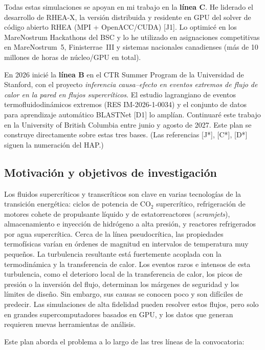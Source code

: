 \documentclass[11pt]{article}
\begin{document}
Todas estas simulaciones se apoyan en mi trabajo en la \textbf{línea C}. He liderado el
desarrollo de RHEA-X, la versión distribuida y residente en GPU del solver de código
abierto RHEA (MPI + OpenACC/CUDA) [J1]. Lo optimicé en los MareNostrum Hackathons del BSC
y lo he utilizado en asignaciones competitivas en MareNostrum~5, Finisterrae~III y
sistemas nacionales canadienses (más de 10 millones de horas de núcleo/GPU en total).

En 2026 inicié la \textbf{línea B} en el CTR Summer Program de la Universidad de Stanford,
con el proyecto \emph{inferencia causa--efecto en eventos extremos de flujo de calor en la
pared en flujos supercríticos}. El estudio lagrangiano de eventos termofluidodinámicos
extremos (RES IM-2026-1-0034) y el conjunto de datos para aprendizaje automático BLASTNet
[D1] lo amplían. Continuaré este trabajo en la University of British Columbia entre junio y
agosto de 2027. Este plan se construye directamente sobre estas tres bases. (Las
referencias [J*], [C*], [D*] siguen la numeración del HAP.)

\subsection{Motivación y objetivos de investigación}
Los fluidos supercríticos y transcríticos son clave en varias tecnologías de la transición
energética: ciclos de potencia de CO$_2$ supercrítico, refrigeración de motores cohete de
propulsante líquido y de estatorreactores (\emph{scramjets}), almacenamiento e inyección de
hidrógeno a alta presión, y reactores refrigerados por agua supercrítica. Cerca de la línea
pseudocrítica, las propiedades termofísicas varían en órdenes de magnitud en intervalos de
temperatura muy pequeños. La turbulencia resultante está fuertemente acoplada con la
termodinámica y la transferencia de calor. Los eventos raros e intensos de esta turbulencia,
como el deterioro local de la transferencia de calor, los picos de presión o la inversión del
flujo, determinan los márgenes de seguridad y los límites de diseño. Sin embargo, sus causas
se conocen poco y son difíciles de predecir. Las simulaciones de alta fidelidad pueden
resolver estos flujos, pero solo en grandes supercomputadores basados en GPU, y los datos
que generan requieren nuevas herramientas de análisis.

Este plan aborda el problema a lo largo de las tres líneas de la convocatoria:
\end{document}
